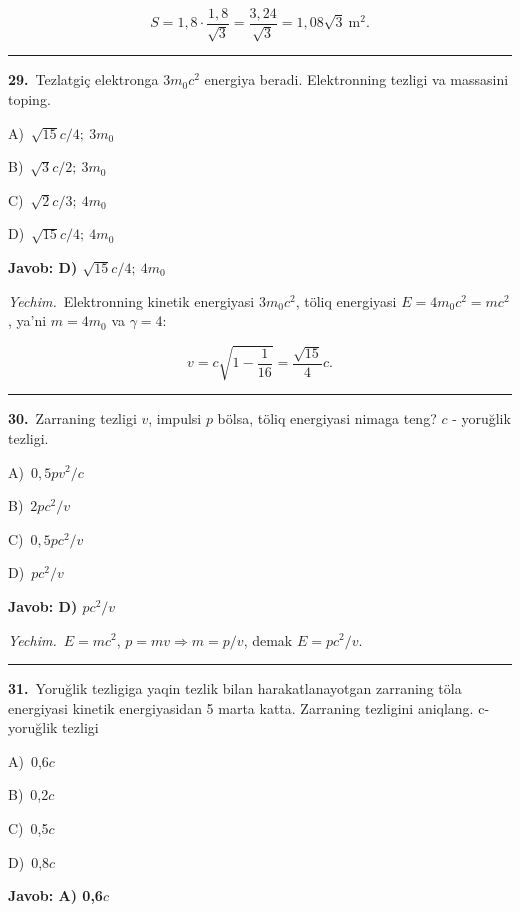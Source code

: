 \documentclass[11pt,a4paper]{article}
\newcommand{\opt}[2]{\hspace*{4mm}#1)\ #2\par}
\begin{document}
\[S=1{,}8\cdot\frac{1{,}8}{\sqrt3}=\frac{3{,}24}{\sqrt3}=1{,}08\sqrt3\ \text{m}^2.\]\par\medskip\hrule\medskip
{}\noindent\begin{minipage}{\linewidth}
\textbf{29.}\ Tezlatgiç elektronga $3m_0c^2$ energiya beradi. Elektronning tezligi va massasini toping.\par\smallskip
\opt{A}{$\sqrt{15}c/4;\ 3m_0$}
\opt{B}{$\sqrt3c/2;\ 3m_0$}
\opt{C}{$\sqrt2c/3;\ 4m_0$}
\opt{D}{$\sqrt{15}c/4;\ 4m_0$}
\end{minipage}\vspace{2pt}\par
\noindent\colorbox{gray!12}{\parbox{\dimexpr\linewidth-2\fboxsep}{\textbf{Javob: D) $\sqrt{15}c/4;\ 4m_0$}}}\par\smallskip
\noindent\textit{Yechim.}\ Elektronning kinetik energiyasi $3m_0c^2$, töliq energiyasi $E=4m_0c^2=mc^2$, ya’ni $m=4m_0$ va $\gamma=4$:\par
\[v=c\sqrt{1-\frac{1}{16}}=\frac{\sqrt{15}}{4}c.\]\par\medskip\hrule\medskip
{}\noindent\begin{minipage}{\linewidth}
\textbf{30.}\ Zarraning tezligi $v$, impulsi $p$ bölsa, töliq energiyasi nimaga teng? $c$ - yoruğlik tezligi.\par\smallskip
\opt{A}{$0{,}5pv^2/c$}
\opt{B}{$2pc^2/v$}
\opt{C}{$0{,}5pc^2/v$}
\opt{D}{$pc^2/v$}
\end{minipage}\vspace{2pt}\par
\noindent\colorbox{gray!12}{\parbox{\dimexpr\linewidth-2\fboxsep}{\textbf{Javob: D) $pc^2/v$}}}\par\smallskip
\noindent\textit{Yechim.}\ $E=mc^2$, $p=mv\Rightarrow m=p/v$, demak $E=pc^2/v$.\par\par\medskip\hrule\medskip
{}\noindent\begin{minipage}{\linewidth}
\textbf{31.}\ Yoruğlik tezligiga yaqin tezlik bilan harakatlanayotgan zarraning töla energiyasi kinetik energiyasidan 5 marta katta. Zarraning tezligini aniqlang. c-yoruğlik tezligi\par\smallskip
\opt{A}{0,6$c$}
\opt{B}{0,2$c$}
\opt{C}{0,5$c$}
\opt{D}{0,8$c$}
\end{minipage}\vspace{2pt}\par
\noindent\colorbox{gray!12}{\parbox{\dimexpr\linewidth-2\fboxsep}{\textbf{Javob: A) 0,6$c$}}}\par\smallskip
\end{document}
